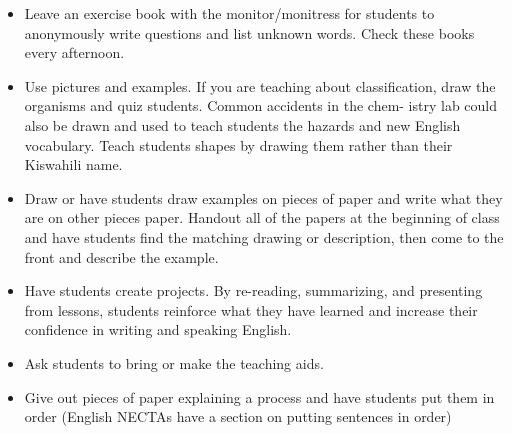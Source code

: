 \begin{itemize}
\item Leave an exercise book with the monitor/monitress for students to
anonymously write questions and list unknown words. Check these books
every afternoon. 
\item Use pictures and examples. If you are teaching about classification,
draw the organisms and quiz students. Common accidents in the chem-
istry lab could also be drawn and used to teach students the hazards
and new English vocabulary. Teach students shapes by drawing them
rather than their Kiswahili name. 
\item Draw or have students draw examples on pieces of paper and write what
they are on other pieces paper. Handout all of the papers at the beginning
of class and have students find the matching drawing or description,
then come to the front and describe the example. 
\item Have students create projects. By re-reading, summarizing, and presenting
from lessons, students reinforce what they have learned and increase
their confidence in writing and speaking English.  
\item Ask students to bring or make the teaching aids. 
\item Give out pieces of paper explaining a process and have students put
them in order (English NECTAs have a section on putting sentences
in order) 
\end{itemize}

